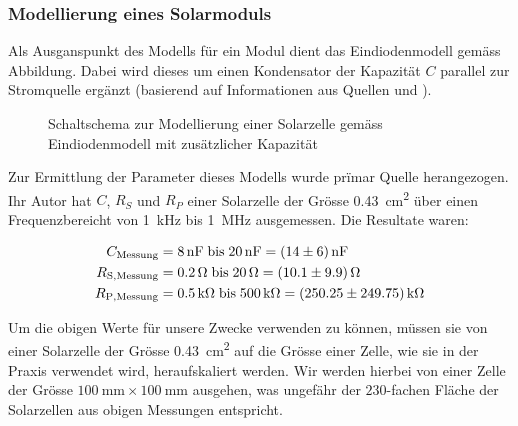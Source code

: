 \subsubsection{Modellierung eines Solarmoduls}
\label{subsubsec:hw:ask:modell}

Als  Ausganspunkt  des  Modells  f\"ur ein  Modul  dient  das  Eindiodenmodell
 gem\"ass  Abbildung. Dabei wird  dieses um
einen  Kondensator  der Kapazit\"at  $C$  parallel  zur Stromquelle  erg\"anzt
(basierend  auf   Informationen  aus  Quellen   \cite{ref:solar:scofield}  und
\cite{ref:solar:friesen}).

\begin{figure}[h!tb]
    \centering
    
    \caption{%
        Schaltschema    zur    Modellierung    einer    Solarzelle    gem\"ass
        Eindiodenmodell mit zus\"atzlicher Kapazit\"at%
    }
    \label{fig:circuit:solarCell}
\end{figure}

Zur   Ermittlung  der   Parameter   dieses  Modells   wurde  pr\"imar   Quelle
\cite{ref:solar:scofield}  herangezogen. Ihr   Autor  hat  $C$,   $R_{S}$  und
$R_{P}$ einer  Solarzelle der Gr\"osse  \SI{0.43}{\centi\meter\squared} \"uber
einen   Frequenzbereicht  von   \SI{1}{\kilo\hertz}  bis   \SI{1}{\mega\hertz}
ausgemessen. Die Resultate waren:

\begin{align}
    C_{\mathrm{Messung}}    &= \SI{8}{\nano\farad} \; \text{bis} \; \SI{20}{\nano\farad}  = \SI{14 \pm 6}{\nano\farad} \\
    R_{\mathrm{S, Messung}} &= \SI{0.2}{\ohm}      \; \text{bis} \; \SI{20}{\ohm}         = \SI{10.1 \pm 9.9}{\ohm}     \\
    R_{\mathrm{P, Messung}} &= \SI{0.5}{\kilo\ohm} \; \text{bis} \; \SI{500}{\kilo\ohm}   = \SI{250.25 \pm 249.75}{\kilo\ohm}
\end{align}

Um  die obigen  Werte  f\"ur  unsere Zwecke  verwenden  zu k\"onnen,  m\"ussen
sie   von  einer   Solarzelle  der   Gr\"osse  \SI{0.43}{\centi\meter\squared}
auf   die  Gr\"osse   einer   Zelle,   wie  sie   in   der  Praxis   verwendet
wird,  heraufskaliert   werden. Wir  werden   hierbei  von  einer   Zelle  der
Gr\"osse $\SI{100}{\milli\meter} \times  \SI{100}{\milli\meter}$ ausgehen, was
ungef\"ahr  der $230$-fachen  Fl\"ache  der Solarzellen  aus obigen  Messungen
entspricht.

